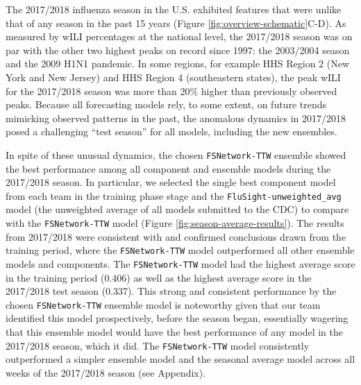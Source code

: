 \documentclass{article}\usepackage[]{graphicx}\usepackage[]{color}
\begin{document}
The 2017/2018 influenza season in the U.S. exhibited features that were unlike that of any season in the past 15 years (Figure \ref{fig:overview-schematic}C-D).
As measured by wILI percentages at the national level, the 2017/2018 season was on par with the other two highest peaks on record since 1997: the 2003/2004 season and the 2009 H1N1 pandemic.
In some regions, for example HHS Region 2 (New York and New Jersey) and HHS Region 4 (southeastern states), the peak wILI for the 2017/2018 season was more than 20\% higher than previously observed peaks.
Because all forecasting models rely, to some extent, on future trends mimicking observed patterns in the past, the anomalous dynamics in 2017/2018 posed a challenging ``test season'' for all models, including the new ensembles.

In spite of these unusual dynamics, the chosen {\tt FSNetwork-TTW} ensemble showed the best performance among all component and ensemble models during the 2017/2018 season.
In particular, we selected the single best component model from each team in the training phase stage and the {\tt FluSight-unweighted\_avg} model (the unweighted average of all models submitted to the CDC) to compare with the {\tt FSNetwork-TTW} model (Figure \ref{fig:season-average-results}).
The results from 2017/2018 were consistent with and confirmed conclusions drawn from the training period, where the {\tt FSNetwork-TTW} model outperformed all other ensemble models and components.
The {\tt FSNetwork-TTW} model had the highest average score in the training period 
(0.406) 
as well as the highest average score in the 2017/2018 test season 
(0.337).
This strong and consistent performance by the chosen {\tt FSNetwork-TTW} ensemble model is noteworthy given that our team identified this model prospectively, before the season began, essentially wagering that this ensemble model would have the best performance of any model in the 2017/2018 season, which it did.
The {\tt FSNetwork-TTW} model consistently outperformed a simpler ensemble model and the seasonal average model across all weeks of the 2017/2018 season (see Appendix).
\end{document}
